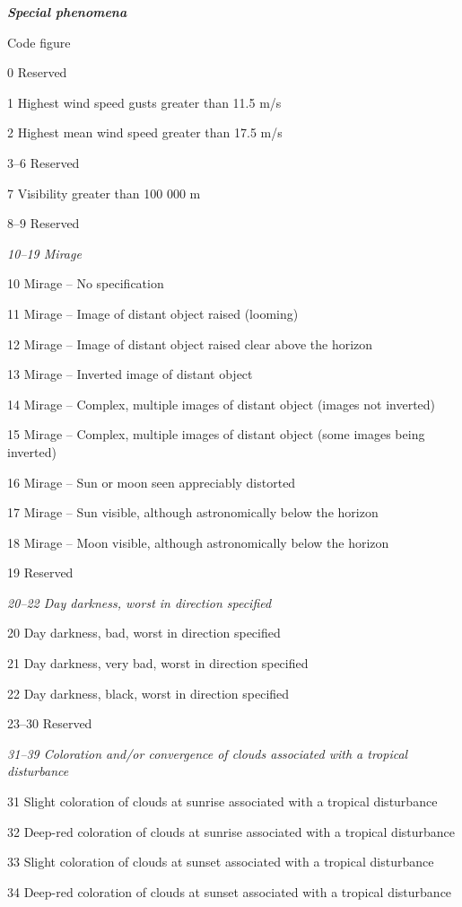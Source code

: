 \emph{\textbf{Special phenomena}}

Code figure

0 Reserved

1 Highest wind speed gusts greater than 11.5 m/s

2 Highest mean wind speed greater than 17.5 m/s

3--6 Reserved

7 Visibility greater than 100 000 m

8--9 Reserved

\emph{10--19 Mirage}

10 Mirage -- No specification

11 Mirage -- Image of distant object raised (looming)

12 Mirage -- Image of distant object raised clear above the horizon

13 Mirage -- Inverted image of distant object

14 Mirage -- Complex, multiple images of distant object (images not inverted)

15 Mirage -- Complex, multiple images of distant object (some images being inverted)

16 Mirage -- Sun or moon seen appreciably distorted

17 Mirage -- Sun visible, although astronomically below the horizon

18 Mirage -- Moon visible, although astronomically below the horizon

19 Reserved

\emph{20--22 Day darkness, worst in direction specified}

20 Day darkness, bad, worst in direction specified

21 Day darkness, very bad, worst in direction specified

22 Day darkness, black, worst in direction specified

23--30 Reserved

\emph{31--39 Coloration and/or convergence of clouds associated with a tropical}\\
\emph{disturbance}

31 Slight coloration of clouds at sunrise associated with a tropical disturbance

32 Deep-red coloration of clouds at sunrise associated with a tropical disturbance

33 Slight coloration of clouds at sunset associated with a tropical disturbance

34 Deep-red coloration of clouds at sunset associated with a tropical disturbance

